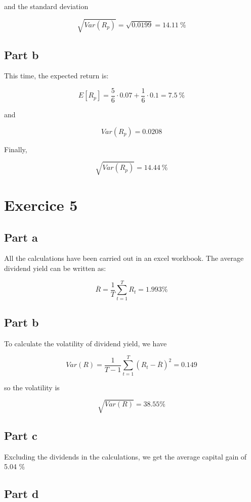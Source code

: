 \documentclass[a4paper,11pt,twoside]{article}
\def \be {\begin{equation}}
\def \ee {\end{equation}}
\begin{document}
and the standard deviation

\be
\sqrt{Var(R_p)} = \sqrt{0.0199} = 14.11\ \%
\ee

\subsection*{Part b}

This time, the expected return is: 

\be
E[R_p] = \frac{5}{6} \cdot 0.07 + \frac{1}{6} \cdot 0.1 = 7.5\ \%
\ee

and

\be
Var(R_p) = 0.0208
\ee

Finally,

\be
\sqrt{Var(R_p)} = 14.44\ \%
\ee

\section*{Exercice 5}

\subsection*{Part a}

All the calculations have been carried out in an excel workbook. The average dividend yield can be written as:

\be
\overline{R} = \frac{1}{T} \sum_{t = 1}^{T} R_t = 1.993 \%
\ee

\subsection*{Part b}

To calculate the volatility of dividend yield, we have

\be
Var(R) = \frac{1}{T-1} \sum_{t = 1}^{T} (R_t-\overline{R})^2 = 0.149
\ee

so the volatility is

\be
\sqrt{Var(R)} = 38.55\%
\ee

\subsection*{Part c}

Excluding the dividends in the calculations, we get the average capital gain of 5.04 \%

\subsection*{Part d}
\end{document}
